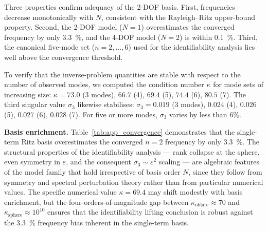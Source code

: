 Three properties confirm adequacy of the 2-DOF basis.  First, frequencies
decrease monotonically with $N$, consistent with the Rayleigh--Ritz
upper-bound property.  Second, the 2-DOF model ($N=1$) overestimates the
converged frequency by only \SI{3.3}{\percent}, and the 4-DOF model ($N=2$)
is within \SI{0.1}{\percent}.  Third, the canonical five-mode set
($n=2,\ldots,6$) used for the identifiability analysis lies well above the
convergence threshold.

To verify that the inverse-problem quantities are stable with respect to the
number of observed modes, we computed the condition number $\kappa$ for
mode sets of increasing size:
$\kappa = 73.0$ (3 modes), $66.7$ (4), $69.4$ (5), $74.4$ (6), $80.5$ (7).
The third singular value $\sigma_3$ likewise stabilises:
$\sigma_3 = 0.019$ (3 modes), $0.024$ (4), $0.026$ (5), $0.027$ (6), $0.028$ (7).
For five or more modes, $\sigma_3$ varies by less than $6\%$.

\medskip\noindent
\textbf{Basis enrichment.}
Table~\ref{tab:app_convergence} demonstrates that the single-term Ritz basis
overestimates the converged $n=2$ frequency by only \SI{3.3}{\percent}.
The structural properties of the identifiability analysis --- rank collapse at
the sphere, even symmetry in $\varepsilon$, and the consequent
$\sigma_3\sim\varepsilon^2$ scaling --- are algebraic features of the model
family that hold irrespective of basis order $N$, since they follow from
symmetry and spectral perturbation theory rather than from particular
numerical values.  The specific numerical value $\kappa=69.4$ may shift
modestly with basis enrichment, but the four-orders-of-magnitude gap between
$\kappa_\mathrm{oblate}\approx 70$ and
$\kappa_\mathrm{sphere}\approx 10^{10}$ ensures that the identifiability
lifting conclusion is robust against the \SI{3.3}{\percent} frequency bias
inherent in the single-term basis.
